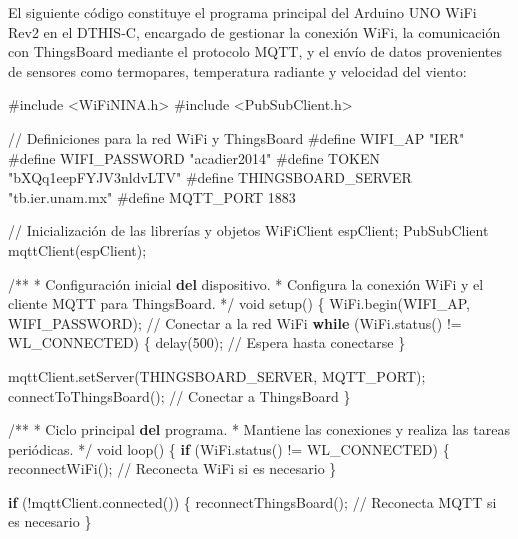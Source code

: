 \documentclass[
  letterpaper,
]{scrbook}
\newenvironment{Shaded}{\begin{snugshade}}{\end{snugshade}}
\newcommand{\CommentTok}[1]{\textcolor[rgb]{0.37,0.37,0.37}{#1}}
\newcommand{\ControlFlowTok}[1]{\textcolor[rgb]{0.00,0.23,0.31}{\textbf{#1}}}
\newcommand{\DecValTok}[1]{\textcolor[rgb]{0.68,0.00,0.00}{#1}}
\newcommand{\KeywordTok}[1]{\textcolor[rgb]{0.00,0.23,0.31}{\textbf{#1}}}
\newcommand{\NormalTok}[1]{\textcolor[rgb]{0.00,0.23,0.31}{#1}}
\newcommand{\OperatorTok}[1]{\textcolor[rgb]{0.37,0.37,0.37}{#1}}
\begin{document}
El siguiente código constituye el programa principal del Arduino UNO
WiFi Rev2 en el DTHIS-C, encargado de gestionar la conexión WiFi, la
comunicación con ThingsBoard mediante el protocolo MQTT, y el envío de
datos provenientes de sensores como termopares, temperatura radiante y
velocidad del viento:

\begin{Shaded}
\begin{Highlighting}[]
\CommentTok{\#include \textless{}WiFiNINA.h\textgreater{}}
\CommentTok{\#include \textless{}PubSubClient.h\textgreater{}}

\OperatorTok{//}\NormalTok{ Definiciones para la red WiFi y ThingsBoard}
\CommentTok{\#define WIFI\_AP "IER"          }
\CommentTok{\#define WIFI\_PASSWORD "acadier2014" }
\CommentTok{\#define TOKEN "bXQq1eepFYJV3nldvLTV"}
\CommentTok{\#define THINGSBOARD\_SERVER "tb.ier.unam.mx"}
\CommentTok{\#define MQTT\_PORT 1883}

\OperatorTok{//}\NormalTok{ Inicialización de las librerías y objetos}
\NormalTok{WiFiClient espClient}\OperatorTok{;}
\NormalTok{PubSubClient mqttClient(espClient)}\OperatorTok{;}

\OperatorTok{/**}
 \OperatorTok{*}\NormalTok{ Configuración inicial }\KeywordTok{del}\NormalTok{ dispositivo.}
 \OperatorTok{*}\NormalTok{ Configura la conexión WiFi y el cliente MQTT para ThingsBoard.}
 \OperatorTok{*/}
\NormalTok{void setup() \{}
\NormalTok{  WiFi.begin(WIFI\_AP, WIFI\_PASSWORD)}\OperatorTok{;}  \OperatorTok{//}\NormalTok{ Conectar a la red WiFi}
  \ControlFlowTok{while}\NormalTok{ (WiFi.status() }\OperatorTok{!=}\NormalTok{ WL\_CONNECTED) \{}
\NormalTok{    delay(}\DecValTok{500}\NormalTok{)}\OperatorTok{;}  \OperatorTok{//}\NormalTok{ Espera hasta conectarse}
\NormalTok{  \}}
  
\NormalTok{  mqttClient.setServer(THINGSBOARD\_SERVER, MQTT\_PORT)}\OperatorTok{;}
\NormalTok{  connectToThingsBoard()}\OperatorTok{;}  \OperatorTok{//}\NormalTok{ Conectar a ThingsBoard}
\NormalTok{\}}

\OperatorTok{/**}
 \OperatorTok{*}\NormalTok{ Ciclo principal }\KeywordTok{del}\NormalTok{ programa.}
 \OperatorTok{*}\NormalTok{ Mantiene las conexiones y realiza las tareas periódicas.}
 \OperatorTok{*/}
\NormalTok{void loop() \{}
  \ControlFlowTok{if}\NormalTok{ (WiFi.status() }\OperatorTok{!=}\NormalTok{ WL\_CONNECTED) \{}
\NormalTok{    reconnectWiFi()}\OperatorTok{;}  \OperatorTok{//}\NormalTok{ Reconecta WiFi si es necesario}
\NormalTok{  \}}
  
  \ControlFlowTok{if}\NormalTok{ (}\OperatorTok{!}\NormalTok{mqttClient.connected()) \{}
\NormalTok{    reconnectThingsBoard()}\OperatorTok{;}  \OperatorTok{//}\NormalTok{ Reconecta MQTT si es necesario}
\NormalTok{  \}}


\end{Highlighting}
\end{Shaded}
\end{document}
